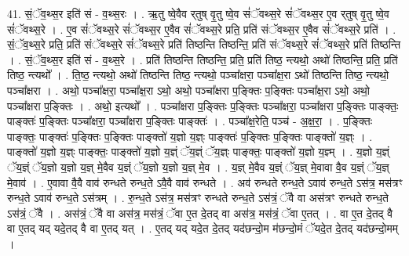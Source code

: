 \documentclass[17pt]{extarticle}
\begin{document}
41. सं॒ॅव॒थ्स॒र इति॑ सं - व॒थ्स॒रः । . ऋ॒तु ष्वे॒वैव र्‌तुष् वृ॒तु ष्वे॒व सं॑ॅवथ्स॒रे सं॑ॅवथ्स॒र ए॒व र्‌तुष् वृ॒तु ष्वे॒व सं॑ॅवथ्स॒रे । . ए॒व सं॑ॅवथ्स॒रे सं॑ॅवथ्स॒र ए॒वैव सं॑ॅवथ्स॒रे प्रति॒ प्रति॑ संॅवथ्स॒र ए॒वैव सं॑ॅवथ्स॒रे प्रति॑ । . सं॒ॅव॒थ्स॒रे प्रति॒ प्रति॑ संॅवथ्स॒रे सं॑ॅवथ्स॒रे प्रति॑ तिष्ठन्ति तिष्ठन्ति॒ प्रति॑ संॅवथ्स॒रे सं॑ॅवथ्स॒रे प्रति॑ तिष्ठन्ति । . सं॒ॅव॒थ्स॒र इति॑ सं - व॒थ्स॒रे । . प्रति॑ तिष्ठन्ति तिष्ठन्ति॒ प्रति॒ प्रति॑ तिष्ठ॒ न्त्यथो॒ अथो॑ तिष्ठन्ति॒ प्रति॒ प्रति॑ तिष्ठ॒ न्त्यथो᳚ । . ति॒ष्ठ॒ न्त्यथो॒ अथो॑ तिष्ठन्ति तिष्ठ॒ न्त्यथो॒ पञ्चा᳚क्षरा॒ पञ्चा᳚क्ष॒रा ऽथो॑ तिष्ठन्ति तिष्ठ॒ न्त्यथो॒ पञ्चा᳚क्षरा । . अथो॒ पञ्चा᳚क्षरा॒ पञ्चा᳚क्ष॒रा ऽथो॒ अथो॒ पञ्चा᳚क्षरा प॒ङ्क्तिः प॒ङ्क्तिः पञ्चा᳚क्ष॒रा ऽथो॒ अथो॒ पञ्चा᳚क्षरा प॒ङ्क्तिः । . अथो॒ इत्यथो᳚ । . पञ्चा᳚क्षरा प॒ङ्क्तिः प॒ङ्क्तिः पञ्चा᳚क्षरा॒ पञ्चा᳚क्षरा प॒ङ्क्तिः पाङ्क्तः॒ पाङ्क्तः॑ प॒ङ्क्तिः पञ्चा᳚क्षरा॒ पञ्चा᳚क्षरा प॒ङ्क्तिः पाङ्क्तः॑ । . पञ्चा᳚क्ष॒रेति॒ पञ्च॑ - अ॒क्ष॒रा॒ । . प॒ङ्क्तिः पाङ्क्तः॒ पाङ्क्तः॑ प॒ङ्क्तिः प॒ङ्क्तिः पाङ्क्तो॑ य॒ज्ञो य॒ज्ञ्ः पाङ्क्तः॑ प॒ङ्क्तिः प॒ङ्क्तिः पाङ्क्तो॑ य॒ज्ञ्ः । . पाङ्क्तो॑ य॒ज्ञो य॒ज्ञ्ः पाङ्क्तः॒ पाङ्क्तो॑ य॒ज्ञो य॒ज्ञ्ं ॅय॒ज्ञ्ं ॅय॒ज्ञ्ः पाङ्क्तः॒ पाङ्क्तो॑ य॒ज्ञो य॒ज्ञ्म् । . य॒ज्ञो य॒ज्ञ्ं ॅय॒ज्ञ्ं ॅय॒ज्ञो य॒ज्ञो य॒ज्ञ् मे॒वैव य॒ज्ञ्ं ॅय॒ज्ञो य॒ज्ञो य॒ज्ञ् मे॒व । . य॒ज्ञ् मे॒वैव य॒ज्ञ्ं ॅय॒ज्ञ् मे॒वावा वै॒व य॒ज्ञ्ं ॅय॒ज्ञ् मे॒वाव॑ । . ए॒वावा वै॒वै वाव॑ रुन्धते रुन्ध॒ते ऽवै॒वै वाव॑ रुन्धते । . अव॑ रुन्धते रुन्ध॒ते ऽवाव॑ रुन्ध॒ते ऽस॑त्र॒ मस॑त्रꣳ रुन्ध॒ते ऽवाव॑ रुन्ध॒ते ऽस॑त्रम् । . रु॒न्ध॒ते ऽस॑त्र॒ मस॑त्रꣳ रुन्धते रुन्ध॒ते ऽस॑त्रं॒ ॅवै वा अस॑त्रꣳ रुन्धते रुन्ध॒ते ऽस॑त्रं॒ ॅवै । . अस॑त्रं॒ ॅवै वा अस॑त्र॒ मस॑त्रं॒ ॅवा ए॒त दे॒तद् वा अस॑त्र॒ मस॑त्रं॒ ॅवा ए॒तत् । . वा ए॒त दे॒तद् वै वा ए॒तद् यद् यदे॒तद् वै वा ए॒तद् यत् । . ए॒तद् यद् यदे॒त दे॒तद् यद॑छन्दो॒म म॑छन्दो॒मं ॅयदे॒त दे॒तद् यद॑छन्दो॒मम् । \newline
\pagebreak
{}
\end{document}
